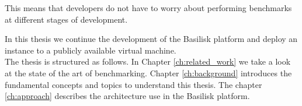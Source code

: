 This means that developers do not have to worry about performing benchmarks at different stages of development.

In this thesis we continue the development of the Basilisk platform and deploy an instance to a publicly available virtual machine.
\\

The thesis is structured as follows. 
In Chapter \ref{ch:related_work} we take a look at the state of the art of \ts{} benchmarking. 
Chapter \ref{ch:background} introduces the fundamental concepts and topics to understand this thesis.
The chapter \ref{ch:approach} describes the architecture use in the Basilisk platform.

